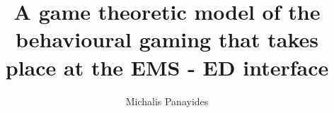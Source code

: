 \title{A game theoretic model of the behavioural gaming that takes place at the EMS - ED interface}
\author{Michalis Panayides}
\date{}
